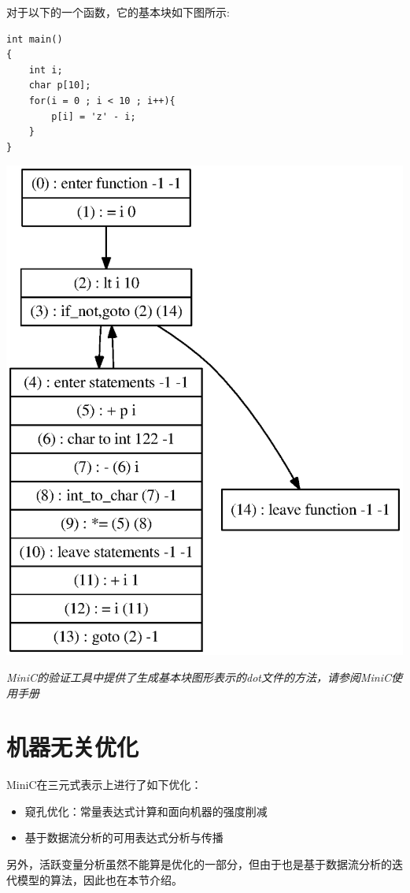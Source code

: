 对于以下的一个函数，它的基本块如下图所示:
\begin{lstlisting}
int main()
{
	int i;
	char p[10];
	for(i = 0 ; i < 10 ; i++){
		p[i] = 'z' - i;
	}
}
\end{lstlisting}
\begin{center}
	\includegraphics[scale=0.5]{basic_block}
\end{center}
{\it \manerrarrow MiniC的验证工具中提供了生成基本块图形表示的dot文件的方法，请参阅MiniC使用手册}\\
\section{机器无关优化}
\label{indepopt}
MiniC在三元式表示上进行了如下优化：
\begin{itemize}
	\item 窥孔优化：常量表达式计算和面向机器的强度削减
	\item 基于数据流分析的可用表达式分析与传播
\end{itemize}
另外，活跃变量分析虽然不能算是优化的一部分，但由于也是基于数据流分析的迭代模型的算法，因此也在本节介绍。

